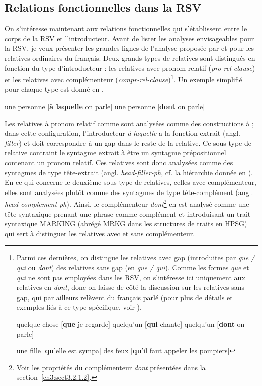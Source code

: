 \subsection{Relations fonctionnelles dans la RSV}\label{ch3:sect3.5.3}
\largerpage[-1]
On s’intéresse maintenant aux relations fonctionnelles qui s’établissent entre le corps de la RSV et l’introducteur. Avant de lister les analyses envisageables pour la RSV, je veux présenter les grandes lignes de l’analyse proposée par \citet{Godard1988} et \citet{AbeilleEtAl2006,AbeilleEtAl2007} pour les relatives ordinaires du français. Deux grands types de relatives sont distingués en fonction du type d’introducteur : les relatives avec pronom relatif (\textit{pro-rel-clause}) et les relatives avec complémenteur (\textit{compr-rel-clause})\footnote{ Parmi ces dernières, on distingue  les relatives avec gap (introduites par \textit{que / qui} ou \textit{dont}) des  relatives sans gap (en \textit{que / qui}). Comme les formes \textit{que} et\textit{ qui} ne sont pas employées dans les RSV, on s’intéresse ici uniquement aux relatives en \textit{dont}, donc on laisse de côté la discussion sur les relatives sans gap, qui par ailleurs relèvent du français parlé (pour plus de détails et exemples liés à ce type spécifique, voir \citealt{AbeilleEtAl2006}).

\ea \label{ch3:fn22i}
\ea quelque chose [\textbf{que} je regarde]
\ex quelqu’un [\textbf{qui} chante]
\ex quelqu’un [\textbf{dont} on parle]
\z
\z

\ea \label{ch3:fn22ii} 
\ea une fille [\textbf{qu}’elle est sympa]
\ex des feux [\textbf{qu}’il faut appeler les pompiers]
\z
\zlast}. Un exemple simplifié pour chaque type est donné en . 


\ea \label{ch3:ex124}
\ea 
une personne [\textbf{à laquelle} on parle] \label{ch3:ex124a} 
\ex
une personne [\textbf{dont} on parle] \label{ch3:ex124b} 
\z 
\z

Les relatives à pronom relatif comme  sont analysées comme des cons\-tructions à  ; dans cette configuration, l’introducteur \textit{à laquelle} a la fonction extrait (angl. \textit{filler}) et doit correspondre à un gap dans le reste de la relative. Ce sous-type de relative contraint le syntagme extrait à être un syntagme prépositionnel contenant un pronom relatif. Ces relatives sont donc analysées comme des syntagmes de type tête-extrait (angl. \textit{head-filler-ph}, cf. la hiérarchie donnée en ). En ce qui concerne le deuxième sous-type de relatives, {\cad} celles avec complémenteur, elles sont analysées plutôt comme des syntagmes de type tête-complément (angl. \textit{head-complement-ph}). Ainsi, le complémenteur \textit{dont}\footnote{Voir les propriétés du complémenteur \textit{dont} présentées dans la section~\ref{ch3:sect3.2.1.2}.} en  est analysé comme une tête syntaxique prenant une phrase comme complément et introduisant un trait syntaxique MARKING (abrégé MRKG dans les structures de traits en HPSG) qui sert à distinguer les relatives avec et sans complémenteur.

